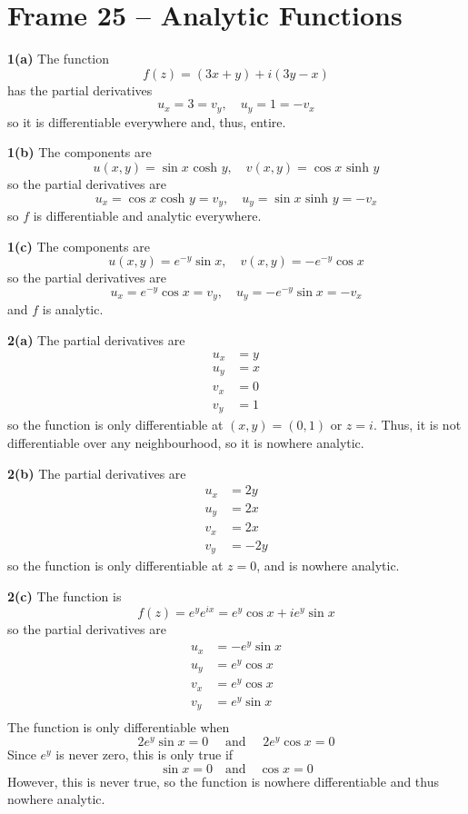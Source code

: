 \documentclass{article}
\begin{document}
\clearpage
\section{Frame 25 -- Analytic Functions}
\textbf{1(a)}
The function
\[
	f(z) = (3x + y) + i(3y - x)
\]
has the partial derivatives
\[
	u_x = 3 = v_y,	\quad	u_y = 1 = -v_x
\]
so it is differentiable everywhere and, thus, entire.

\textbf{1(b)}
The components are
\[
	u(x, y) = \sin x \text{ cosh } y,	\quad
	v(x, y) = \cos x \text{ sinh } y
\]
so the partial derivatives are
\[
	u_x = \cos x \text{ cosh } y = v_y,	\quad
	u_y = \sin x \text{ sinh } y = -v_x
\]
so $f$ is differentiable and analytic everywhere.

\textbf{1(c)}
The components are
\[
	u(x, y) = e^{-y} \sin x, 	\quad
	v(x, y) = -e^{-y} \cos x
\]
so the partial derivatives are
\[
	u_x = e^{-y} \cos x = v_y,	\quad
	u_y = -e^{-y} \sin x = -v_x
\]
and $f$ is analytic.

\textbf{2(a)}
The partial derivatives are
\begin{align*}
	u_x &= y \\
	u_y &= x \\
	v_x &= 0 \\
	v_y &= 1
\end{align*}
so the function is only differentiable at $(x, y) = (0, 1)$ or $z = i$. Thus, it is not differentiable over any neighbourhood, so it is nowhere analytic.

\textbf{2(b)}
The partial derivatives are
\begin{align*}
	u_x &= 2y \\
	u_y &= 2x \\
	v_x &= 2x \\
	v_y &= -2y
\end{align*}
so the function is only differentiable at $z = 0$, and is nowhere analytic.

\textbf{2(c)}
The function is
\[
	f(z) = e^{y} e^{ix} = e^y \cos x + i e^y \sin x
\]
so the partial derivatives are
\begin{align*}
	u_x &= -e^y \sin x \\
	u_y &=  e^y \cos x \\
	v_x &=  e^y \cos x \\
	v_y &=  e^y \sin x \\
\end{align*}
The function is only differentiable when
\[
	2 e^y \sin x = 0	\quad \text{ and } \quad	2 e^y \cos x = 0
\]
Since $e^y$ is never zero, this is only true if
\[
	\sin x = 0	\quad \text{and} \quad \cos x = 0
\]
However, this is never true, so the function is nowhere differentiable and thus nowhere analytic.
\end{document}
